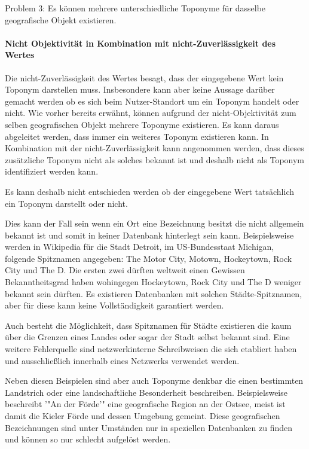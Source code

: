 				Problem 3: Es können mehrere unterschiedliche Toponyme für dasselbe geografische Objekt existieren.  


			\paragraph{Nicht Objektivität in Kombination mit nicht-Zuverlässigkeit des Wertes} 

				Die nicht-Zuverlässigkeit des Wertes besagt, dass der eingegebene Wert kein Toponym darstellen muss.
				Insbesondere kann aber keine Aussage darüber gemacht werden ob es sich beim Nutzer-Standort um ein Toponym handelt oder nicht. 
				Wie vorher bereits erwähnt, können aufgrund der nicht-Objektivität zum selben geografischen Objekt mehrere Toponyme existieren.
				Es kann daraus abgeleitet werden, dass immer ein weiteres Toponym existieren kann.
				In Kombination mit der nicht-Zuverlässigkeit kann angenommen werden, dass dieses zusätzliche Toponym nicht als solches bekannt ist und deshalb nicht als Toponym identifiziert werden kann.

				Es kann deshalb nicht entschieden werden ob der eingegebene Wert tatsächlich ein Toponym darstellt oder nicht. 
				
				Dies kann der Fall sein wenn ein Ort eine Bezeichnung besitzt die nicht allgemein bekannt ist und somit in keiner Datenbank hinterlegt sein kann. 
				Beispielsweise werden in Wikipedia für die Stadt Detroit, im US-Bundesstaat Michigan, folgende Spitznamen angegeben: The Motor City, Motown, Hockeytown, Rock City und The D. 
				Die ersten zwei dürften weltweit einen Gewissen Bekanntheitsgrad haben wohingegen Hockeytown, Rock City und The D weniger bekannt sein dürften.  
				Es existieren Datenbanken mit solchen Städte-Spitznamen, aber für diese kann keine Vollständigkeit garantiert werden. 
				
				Auch besteht die Möglichkeit, dass Spitznamen für Städte existieren die kaum über die Grenzen eines Landes oder sogar der Stadt selbst bekannt sind. 
				Eine weitere Fehlerquelle sind netzwerkinterne Schreibweisen die sich etabliert haben und ausschließlich innerhalb eines Netzwerks verwendet werden.

				Neben diesen Beispielen sind aber auch Toponyme denkbar die einen bestimmten Landstrich oder eine landschaftliche Besonderheit beschreiben.
				Beispielsweise beschreibt '"An der Förde'" eine geografische Region an der Ostsee, meist ist damit die Kieler Förde und dessen Umgebung gemeint. 
				Diese geografischen Bezeichnungen sind unter Umständen nur in speziellen Datenbanken zu finden und können so nur schlecht aufgelöst werden. 

